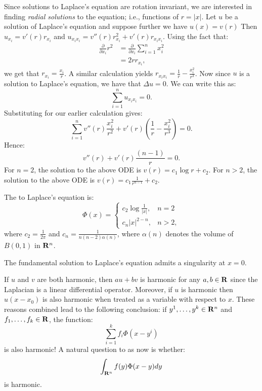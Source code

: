 \begin{example}
	Since solutions to Laplace's equation are rotation invariant, we are interested in finding \textit{radial solutions} to the equation; i.e., functions of $r = |x|$. Let $u$ be a solution of Laplace's equation and suppose further we have $u(x) = v(r)$ Then $u_{x_i} = v'(r) r_{x_i}$ and $u_{x_i x_i} = v''(r) r_{x_i}^2 + v'(r)r_{x_i x_i}$. Using the fact that:
	\begin{align*}
		\frac{\partial}{\partial x_i} r^2 
		&= \frac{\partial}{\partial x_i} \sum_{i=1}^{n} x_i^2  \\
		&= 2r r_{x_i},
	\end{align*}
	we get that $r_{x_i} = \frac{x_i}{r}$. A similar calculation yields $r_{x_i x_i} = \frac{1}{r} - \frac{x_i^2}{r^3}$. Now since $u$ is a solution to Laplace's equation, we have that $\Delta u = 0$. We can write this as:
	\[
		\sum_{i=1}^{n} u_{x_i x_i} = 0.
	\] 
	Substituting for our earlier calculation gives:
	\[
		\sum_{i=1}^{n}v''(r) \frac{x_i^2}{r^2} + v'(r)\left(\frac{1}{r} - \frac{x_i^2}{r^3}\right) = 0. 
	\] 
	Hence:
	\[
		v''(r)+v'(r) \frac{(n-1)}{r} = 0.
	\]
	For $n=2$, the solution to the above ODE is $v(r) = c_1 \log r + c_2$. For $n > 2$, the solution to the above ODE is $v(r) = c_1 \frac{1}{r^{n-1}} + c_2$.
\end{example}

\begin{definition}
	The  to Laplace's equation is:
	\[
		\Phi(x)=
		\begin{cases}
			c_2 \log \frac{1}{|x|}, & n = 2 \\
			c_n |x|^{2-n}, & n > 2,
		\end{cases}
	\] 
	where $c_2 = \frac{1}{2\pi}$ and $c_n = \frac{1}{n(n-2)\alpha(n)}$, where $\alpha(n)$ denotes the volume of $B(0,1)$ in $\mathbf{R}^n$.
\end{definition}

\begin{remark}
	The fundamental solution to Laplace's equation admits a singularity at $x = 0$.
\end{remark}

\begin{remark}
	If $u$ and $v$ are both harmonic, then $au + bv$ is harmonic for any $a,b \in \mathbf{R}$ since the Laplacian is a linear differential operator. Moreover, if $u$ is harmonic then $u(x-x_0)$ is also harmonic when treated as a variable with respect to $x$. These reasons combined lead to the following conclusion: if $y^1,\ldots,y^k \in \mathbf{R}^n$ and $f_1,\ldots,f_k \in \mathbf{R}$, the function:
	\[
		\sum_{i=1}^{k} f_i \Phi(x-y^i)
	\] 
	is also harmonic! A natural question to as now is whether:
	\[
		\int_{\mathbf{R}^n}^{} f(y) \Phi(x-y)dy
	\]
	is harmonic. 
\end{remark}

